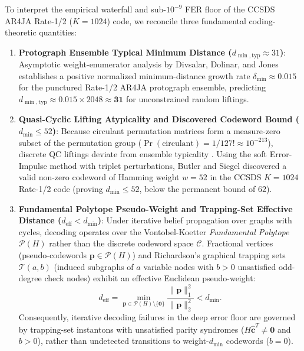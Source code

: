\documentclass[10pt]{article}
\begin{document}
To interpret the empirical waterfall and sub-$10^{-9}$ FER floor of the CCSDS AR4JA Rate-1/2 ($K=1024$) code, we reconcile three fundamental coding-theoretic quantities:
\begin{enumerate}[leftmargin=1.8em, itemsep=2pt]
    \item \textbf{Protograph Ensemble Typical Minimum Distance ($d_{\min,\mathrm{typ}} \approx 31$)}: Asymptotic weight-enumerator analysis by Divsalar, Dolinar, and Jones \cite{divsalar_linear_distance} establishes a positive normalized minimum-distance growth rate $\delta_{\min} \approx 0.015$ for the punctured Rate-1/2 AR4JA protograph ensemble, predicting $d_{\min,\mathrm{typ}} \approx 0.015 \times 2048 \approx \mathbf{31}$ for unconstrained random liftings.
    \item \textbf{Quasi-Cyclic Lifting Atypicality and Discovered Codeword Bound ($d_{\min} \le 52$)}: Because circulant permutation matrices form a measure-zero subset of the permutation group ($\Pr(\text{circulant}) = 1/127! \approx 10^{-213}$), discrete QC liftings deviate from ensemble typicality \cite{butler_siegel_bounds}. Using the soft Error-Impulse method with triplet perturbations, Butler and Siegel \cite{butler_siegel_bounds} discovered a valid non-zero codeword of Hamming weight $w = 52$ in the CCSDS $K=1024$ Rate-1/2 code (proving $d_{\min} \le 52$, below the permanent bound of $62$).
    \item \textbf{Fundamental Polytope Pseudo-Weight and Trapping-Set Effective Distance ($d_{\mathrm{eff}} < d_{\min}$)}: Under iterative belief propagation over graphs with cycles, decoding operates over the Vontobel-Koetter \emph{Fundamental Polytope} $\mathcal{P}(H)$ \cite{vontobel_koetter_gauss_seidel} rather than the discrete codeword space $\mathcal{C}$. Fractional vertices (pseudo-codewords $\mathbf{p} \in \mathcal{P}(H)$) and Richardson's graphical trapping sets $\mathcal{T}(a, b)$ \cite{richardson_trapping_sets, vasic_absorbing_sets} (induced subgraphs of $a$ variable nodes with $b > 0$ unsatisfied odd-degree check nodes) exhibit an effective Euclidean pseudo-weight:
    \begin{equation}
    d_{\mathrm{eff}} = \min_{\mathbf{p} \in \mathcal{P}(H) \setminus \{\mathbf{0}\}} \frac{\|\mathbf{p}\|_1^2}{\|\mathbf{p}\|_2^2} < d_{\min}.
    \end{equation}
    Consequently, iterative decoding failures in the deep error floor are governed by trapping-set instantons with unsatisfied parity syndromes ($H\hat{\mathbf{c}}^T \ne \mathbf{0}$ and $b > 0$), rather than undetected transitions to weight-$d_{\min}$ codewords ($b = 0$).
\end{enumerate}
\end{document}
